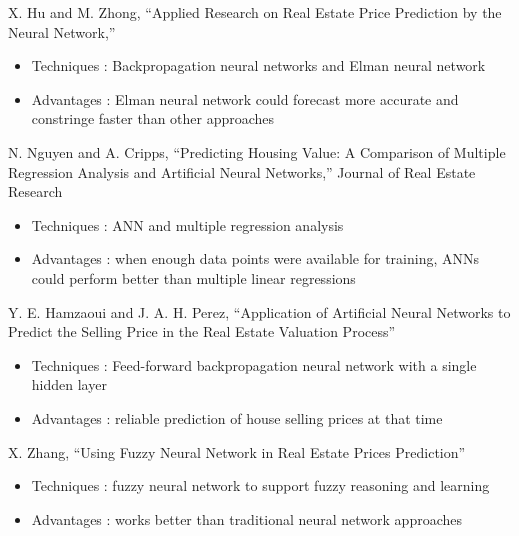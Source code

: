 \documentclass[11pt,fleqn]{book} %
\begin{document}
\begin{remark}
    X. Hu and M. Zhong, “Applied Research on Real Estate Price Prediction by the Neural Network,”
    \begin{itemize}
        \item Techniques : Backpropagation neural networks and Elman neural network
        \item Advantages : Elman neural network could forecast more accurate
and constringe faster than other approaches
    \end{itemize}
\end{remark}


\begin{remark}
    N. Nguyen and A. Cripps, “Predicting Housing Value: A Comparison of Multiple Regression Analysis and Artificial Neural Networks,”
Journal of Real Estate Research
    \begin{itemize}
        \item Techniques : ANN and multiple regression analysis
        \item Advantages : when enough data points were available for training, ANNs could perform better than multiple linear regressions
    \end{itemize}
\end{remark}


\begin{remark}
    Y. E. Hamzaoui and J. A. H. Perez, “Application of Artificial Neural Networks to Predict the Selling Price in the Real Estate Valuation Process”
    \begin{itemize}
        \item Techniques : Feed-forward backpropagation neural network with a single hidden layer
        \item Advantages : reliable prediction of house selling prices at that time
    \end{itemize}
\end{remark}


\begin{remark}
    X. Zhang, “Using Fuzzy Neural Network in Real Estate Prices Prediction”
    \begin{itemize}
        \item Techniques : fuzzy neural network to support fuzzy reasoning and learning
        \item Advantages : works better than traditional neural network approaches
    \end{itemize}
\end{remark}
\end{document}
